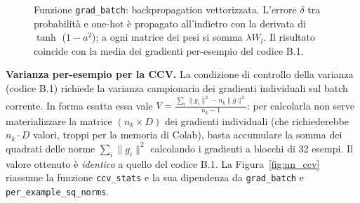 \documentclass[a4paper,12pt]{article}
\numberwithin{equation}{section}
\numberwithin{figure}{section}
\numberwithin{table}{section}
\begin{document}
\begin{figure}[H]
{}
\caption{Funzione \texttt{grad\_batch}: backpropagation vettorizzata.
L'errore $\delta$ tra probabilità e one-hot è propagato all'indietro con la
derivata di $\tanh$ ($1-a^2$); a ogni matrice dei pesi si somma $\lambda W_l$.
Il risultato coincide con la media dei gradienti per-esempio del codice B.1.}
\label{fig:nn_grad}
\end{figure}
\textbf{Varianza per-esempio per la CCV.}
La condizione di controllo della varianza (codice B.1) richiede la varianza
campionaria dei gradienti individuali sul batch corrente. In forma esatta essa
vale $V = \frac{\sum_i\|g_i\|^2 - n_k\|\bar g\|^2}{n_k - 1}$: per calcolarla
non serve materializzare la matrice $(n_k \times D)$ dei gradienti individuali
(che richiederebbe $n_k \cdot D$ valori, troppi per la memoria di Colab), basta
accumulare la somma dei quadrati delle norme $\sum_i\|g_i\|^2$ calcolando i
gradienti a blocchi di 32 esempi. Il valore ottenuto è \emph{identico} a quello
del codice B.1. La Figura~\ref{fig:nn_ccv} riassume la funzione
\texttt{ccv\_stats} e la sua dipendenza da \texttt{grad\_batch} e
\texttt{per\_example\_sq\_norms}.
\end{document}
